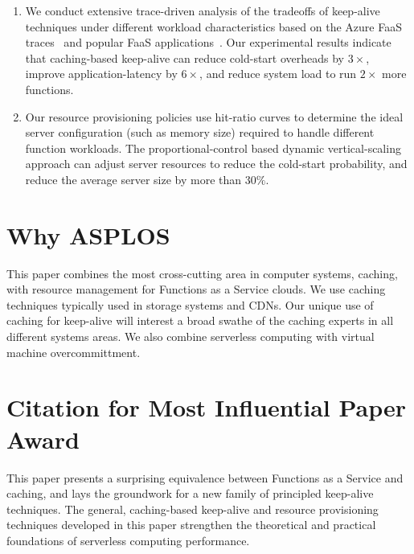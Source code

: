 \documentclass[pageno]{jpaper}
\begin{document}
\begin{enumerate}
\item  We conduct extensive trace-driven analysis of the tradeoffs of keep-alive techniques under different workload characteristics based on the Azure FaaS traces~\cite{shahrad_serverless_2020} and popular FaaS applications~\cite{kim_functionbench_2019}. 
    Our experimental results indicate that caching-based keep-alive can reduce cold-start overheads by $3\times$,
  improve application-latency by $6\times$,
  and reduce system load to run $2\times$ more functions.
  \item Our resource provisioning policies use hit-ratio curves to determine the ideal server configuration (such as memory size) required to handle different function workloads. The proportional-control based dynamic vertical-scaling approach can adjust server resources to reduce the cold-start probability, and reduce the average server size by more than $30\%$. 

\end{enumerate}



\section{Why ASPLOS}
\vspace*{\subsecspace}
This paper combines the most cross-cutting area in computer systems, caching, with resource management for Functions as a Service clouds. 
We use caching techniques typically used in storage systems and CDNs. 
Our unique use of caching for keep-alive will interest a broad swathe of the caching experts in all different systems areas.
We also combine serverless computing with virtual machine overcommittment. 

\section{Citation for Most Influential Paper Award}
\vspace*{\subsecspace}

This paper presents a surprising equivalence between Functions as a Service and caching, and lays the groundwork for a new family of principled keep-alive techniques. 
The general, caching-based keep-alive and resource provisioning techniques developed in this paper strengthen the theoretical and practical foundations of serverless computing performance. 




\end{document}
